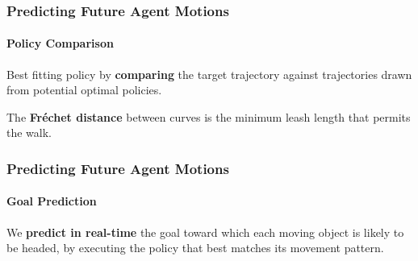 \begin{frame}
	\frametitle{Predicting Future Agent Motions}
	\framesubtitle{Policy Comparison}
	
	\Large
	
	\vspace{0.3cm}
	
	Best fitting policy by \textbf{comparing} the target trajectory against trajectories drawn from
	potential optimal policies.
	
	\vspace{-0.3cm}
	
	\begin{center}
	\end{center}
	
	\vspace{-0.5cm}
	
	The \textbf{Fr\'echet distance} between curves is the minimum leash length that permits the walk.\\
\end{frame}

\begin{frame}
	\frametitle{Predicting Future Agent Motions}
	\framesubtitle{Goal Prediction}
	
	\Large
	
	\vspace{0.25cm}
	
	We \textbf{predict in real-time} the goal toward which each moving object is likely to be headed,
	by executing the policy that best matches its movement pattern.
	
	\vspace{-0.1cm}
	
	\begin{center}
	\end{center}
\end{frame}
